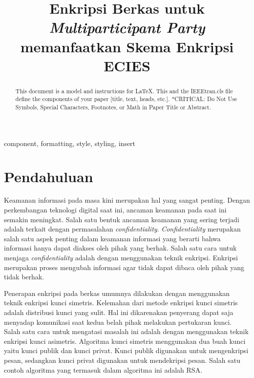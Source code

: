 \documentclass[conference]{IEEEtran}
\begin{document}
\title{Enkripsi Berkas untuk \emph{Multiparticipant Party} memanfaatkan Skema Enkripsi ECIES}

\author{
}


\maketitle

\begin{abstract}
This document is a model and instructions for \LaTeX.
This and the IEEEtran.cls file define the components of your paper [title, text, heads, etc.]. *CRITICAL: Do Not Use Symbols, Special Characters, Footnotes, 
or Math in Paper Title or Abstract.
\end{abstract}

\begin{IEEEkeywords}
component, formatting, style, styling, insert
\end{IEEEkeywords}

\section{Pendahuluan}
Keamanan informasi pada masa kini merupakan hal yang sangat penting. Dengan perkembangan teknologi digital saat ini, ancaman keamanan pada saat ini semakin meningkat. Salah satu bentuk ancaman keamanan yang sering terjadi adalah terkait dengan permasalahan \emph{confidentiality}. \emph{Confidentiality} merupakan salah satu aspek penting dalam keamanan informasi yang berarti bahwa informasi hanya dapat diakses oleh pihak yang berhak. Salah satu cara untuk menjaga \emph{confidentiality} adalah dengan menggunakan teknik enkripsi. Enkripsi merupakan proses mengubah informasi agar tidak dapat dibaca oleh pihak yang tidak berhak.

Penerapan enkripsi pada berkas umumnya dilakukan dengan menggunakan teknik enkripsi kunci simetris. Kelemahan dari metode enkripsi kunci simetris adalah distribusi kunci yang sulit. Hal ini dikarenakan penyerang dapat saja menyadap komunikasi saat kedua belah pihak melakukan pertukaran kunci. Salah satu cara untuk mengatasi masalah ini adalah dengan menggunakan teknik enkripsi kunci asimetris. Algoritma kunci simetris menggunakan dua buah kunci yaitu kunci publik dan kunci privat. Kunci publik digunakan untuk mengenkripsi pesan, sedangkan kunci privat digunakan untuk mendekripsi pesan. Salah satu contoh algoritma yang termasuk dalam algoritma ini adalah RSA.
\end{document}
